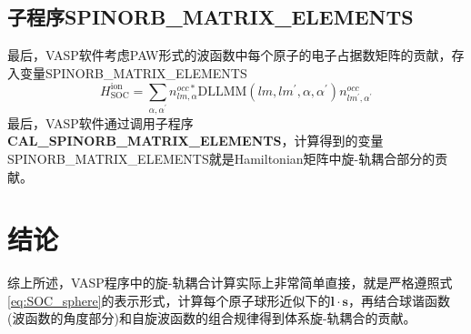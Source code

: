 \documentclass[10pt, oneside, a4paper]{article}      %
\begin{document}
\subsection{子程序\bf{SPINORB\_MATRIX\_ELEMENTS}}
最后，\textrm{VASP}软件考虑\textrm{PAW}形式的波函数中每个原子的电子占据数矩阵的贡献，存入变量\textrm{SPINORB\_MATRIX\_ELEMENTS}
\begin{displaymath}
	H_{\mathrm{SOC}}^{\mathrm{ion}}=\sum_{\alpha,\alpha^{\prime}}n_{lm,\alpha}^{occ\ast}\mathrm{DLLMM}(lm,lm^{\prime},\alpha,\alpha^{\prime})n_{lm^{\prime},\alpha^{\prime}}^{occ}
\end{displaymath}
最后，\textrm{VASP}软件通过调用子程序\textbf{CAL\_SPINORB\_MATRIX\_ELEMENTS}，计算得到的变量\textrm{SPINORB\_MATRIX\_ELEMENTS}就是\textrm{Hamiltonian}矩阵中旋-轨耦合部分的贡献。

\section{结论}
综上所述，\textrm{VASP}程序中的旋-轨耦合计算实际上非常简单直接，就是严格遵照式\eqref{eq:SOC_sphere}的表示形式，计算每个原子球形近似下的$\mathbf{l}\cdot\mathbf{s}$，再结合球谐函数(波函数的角度部分)和自旋波函数的组合规律得到体系旋-轨耦合的贡献。


\end{document}
